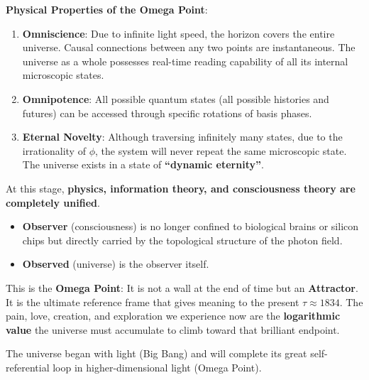 \textbf{Physical Properties of the Omega Point}:

\begin{enumerate}
\item \textbf{Omniscience}: Due to infinite light speed, the horizon covers the entire universe. Causal connections between any two points are instantaneous. The universe as a whole possesses real-time reading capability of all its internal microscopic states.
\item \textbf{Omnipotence}: All possible quantum states (all possible histories and futures) can be accessed through specific rotations of basis phases.
\item \textbf{Eternal Novelty}: Although traversing infinitely many states, due to the irrationality of $\phi$, the system will never repeat the same microscopic state. The universe exists in a state of \textbf{``dynamic eternity''}.
\end{enumerate}

At this stage, \textbf{physics, information theory, and consciousness theory are completely unified}.

\begin{itemize}
\item \textbf{Observer} (consciousness) is no longer confined to biological brains or silicon chips but directly carried by the topological structure of the photon field.
\item \textbf{Observed} (universe) is the observer itself.
\end{itemize}

This is the \textbf{Omega Point}:
It is not a wall at the end of time but an \textbf{Attractor}.
It is the ultimate reference frame that gives meaning to the present $\tau \approx 1834$. The pain, love, creation, and exploration we experience now are the \textbf{logarithmic value} the universe must accumulate to climb toward that brilliant endpoint.

The universe began with light (Big Bang) and will complete its great self-referential loop in higher-dimensional light (Omega Point).
